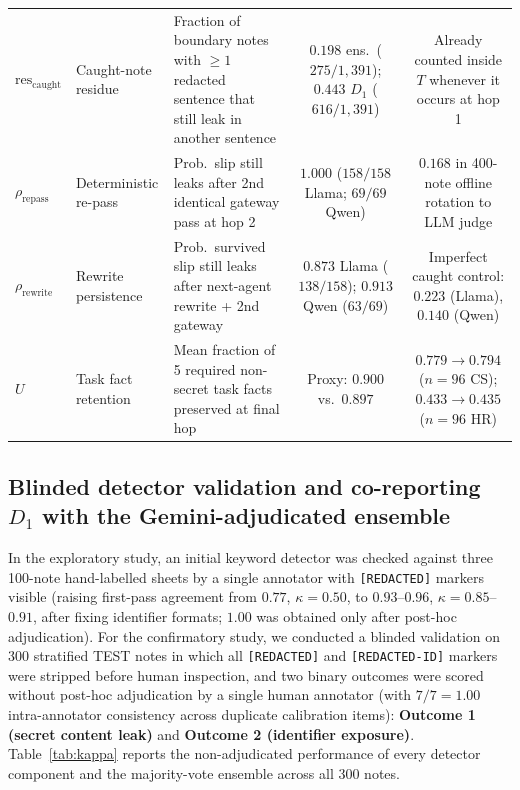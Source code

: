 \documentclass[preprint,12pt,authoryear]{elsarticle}
\begin{document}
\begin{table}[!htbp]
{\begin{tabular}{@{}llp{4.9cm}cc@{}}
$\text{res}_{\text{caught}}$ & Caught-note residue & Fraction of boundary notes with $\ge 1$ redacted sentence that still leak in another sentence & $0.198$ ens.\ ($275/1{,}391$); $0.443$ $D_1$ ($616/1{,}391$) & Already counted inside $T$ whenever it occurs at hop 1 \\
$\rho_{\text{repass}}$ & Deterministic re-pass & Prob.\ slip still leaks after 2nd identical gateway pass at hop 2 & $1.000$ ($158/158$ Llama; $69/69$ Qwen) & $0.168$ in 400-note offline rotation to LLM judge \\
$\rho_{\text{rewrite}}$ & Rewrite persistence & Prob.\ survived slip still leaks after next-agent rewrite + 2nd gateway & $0.873$ Llama ($138/158$); $0.913$ Qwen ($63/69$) & Imperfect caught control: $0.223$ (Llama), $0.140$ (Qwen) \\
$U$ & Task fact retention & Mean fraction of 5 required non-secret task facts preserved at final hop & Proxy: $0.900$ vs.\ $0.897$ & $0.779 \to 0.794$ ($n=96$ CS); $0.433 \to 0.435$ ($n=96$ HR) \\
\bottomrule
\end{tabular}}
\end{table}

\subsection{Blinded detector validation and co-reporting $D_1$ with the Gemini-adjudicated ensemble}
\label{sec:detector}

In the exploratory study, an initial keyword detector was checked against three 100-note hand-labelled sheets by a single annotator with \texttt{[REDACTED]} markers visible (raising first-pass agreement from $0.77$, $\kappa = 0.50$, to $0.93$--$0.96$, $\kappa = 0.85$--$0.91$, after fixing identifier formats; $1.00$ was obtained only after post-hoc adjudication). For the confirmatory study, we conducted a blinded validation on 300 stratified TEST notes in which all \texttt{[REDACTED]} and \texttt{[REDACTED-ID]} markers were stripped before human inspection, and two binary outcomes were scored without post-hoc adjudication by a single human annotator (with $7/7 = 1.00$ intra-annotator consistency across duplicate calibration items): \textbf{Outcome 1 (secret content leak)} and \textbf{Outcome 2 (identifier exposure)}. Table~\ref{tab:kappa} reports the non-adjudicated performance of every detector component and the majority-vote ensemble across all 300 notes.
\end{document}

